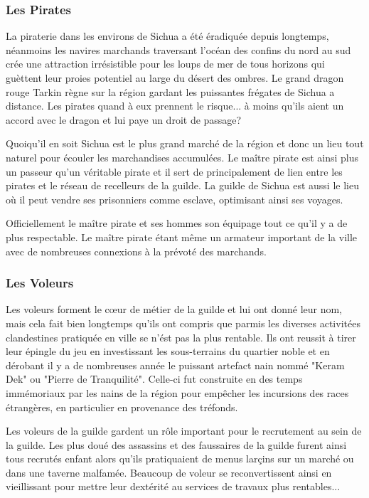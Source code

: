 \subsubsection{Les Pirates}

La piraterie dans les environs de Sichua a été éradiquée depuis longtemps,
néanmoins les navires marchands traversant l'océan des confins du nord au sud
crée une attraction irrésistible pour les loups de mer de tous horizons qui
guèttent leur proies potentiel au large du désert des ombres. Le grand dragon 
rouge Tarkin règne sur la région gardant les puissantes frégates de Sichua a
distance. Les pirates quand à eux prennent le risque... à moins qu'ils aient 
un accord avec le dragon et lui paye un droit de passage? 

Quoiqu'il en soit Sichua est le plus grand marché de la région et donc un lieu 
tout naturel pour écouler les marchandises accumulées. Le maître pirate est ainsi
plus un passeur qu'un véritable pirate et il sert de principalement de lien entre 
les pirates et le réseau de recelleurs de la guilde. La guilde de Sichua est aussi
le lieu où il peut vendre ses prisonniers comme esclave, optimisant ainsi ses 
voyages. 

Officiellement le maître pirate et ses hommes son équipage tout ce qu'il y a de 
plus respectable. Le maître pirate étant même un armateur important de la ville
avec de nombreuses connexions à la prévoté des marchands.


\subsubsection{Les Voleurs}

Les voleurs forment le c\oe{}ur de métier de la guilde et lui ont donné leur 
nom, mais cela fait bien longtemps qu'ils ont compris que parmis les diverses 
activitées clandestines pratiquée en ville se n'ést pas la plus rentable. Ils
ont reussit à tirer leur épingle du jeu en investissant les sous-terrains du
quartier noble et en dérobant il y a de nombreuses année le puissant artefact 
nain nommé "Keram Dek" ou "Pierre de Tranquilité". Celle-ci fut construite en 
des temps immémoriaux par les nains de la région pour empêcher les incursions
des races étrangères, en particulier en provenance des tréfonds.

Les voleurs de la guilde gardent un rôle important pour le recrutement au sein
de la guilde. Les plus doué des assassins et des faussaires de la guilde furent
ainsi tous recrutés enfant alors qu'ils pratiquaient de menus larçins sur un marché 
ou dans une taverne malfamée. Beaucoup de voleur se reconvertissent ainsi en
vieillissant pour mettre leur dextérité au services de travaux plus rentables...

